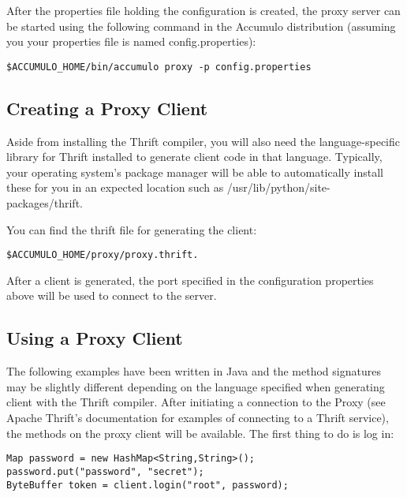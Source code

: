 After the properties file holding the configuration is created, the proxy server
can be started using the following command in the Accumulo distribution (assuming
you your properties file is named config.properties):

\begingroup\fontsize{8pt}{8pt}\selectfont\begin{verbatim}
$ACCUMULO_HOME/bin/accumulo proxy -p config.properties
\end{verbatim}\endgroup

\subsection{Creating a Proxy Client}

Aside from installing the Thrift compiler, you will also need the language-specific library
for Thrift installed to generate client code in that language. Typically, your operating
system's package manager will be able to automatically install these for you in an expected
location such as /usr/lib/python/site-packages/thrift.

You can find the thrift file for generating the client:

\begingroup\fontsize{8pt}{8pt}\selectfont\begin{verbatim}
$ACCUMULO_HOME/proxy/proxy.thrift.
\end{verbatim}\endgroup

After a client is generated, the port specified in the configuration properties above will be
used to connect to the server.

\subsection{Using a Proxy Client}

The following examples have been written in Java and the method signatures may be
slightly different depending on the language specified when generating client with
the Thrift compiler. After initiating a connection to the Proxy (see Apache Thrift's
documentation for examples of connecting to a Thrift service), the methods on the
proxy client will be available. The first thing to do is log in:

\begingroup\fontsize{8pt}{8pt}\selectfont\begin{verbatim}
Map password = new HashMap<String,String>();
password.put("password", "secret");
ByteBuffer token = client.login("root", password);
\end{verbatim}\endgroup

